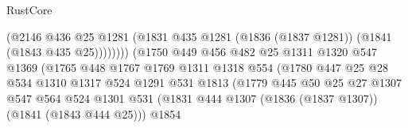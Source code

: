 \begin{lexlean}{RustCore}
\begin{coremodule}
                                            (@2146
                                              @436
                                              @25
                                              @1281
                                              (@1831
                                                @435
                                                @1281
                                                (@1836 (@1837 @1281))
                                                (@1841 (@1843 @435 @25))))))))
                                    (@1750
                                      @449
                                      @456
                                      @482
                                      @25
                                      @1311
                                      @1320
                                      @547
                                      @1369
                                      (@1765
                                        @448
                                        @1767
                                        @1769
                                        @1311
                                        @1318
                                        @554
                                        (@1780
                                          @447
                                          @25
                                          @28
                                          @534
                                          @1310
                                          @1317
                                          @524
                                          @1291
                                          @531
                                          @1813
                                          (@1779
                                            @445
                                            @50
                                            @25
                                            @27
                                            @1307
                                            @547
                                            @564
                                            @524
                                            @1301
                                            @531
                                            (@1831
                                              @444
                                              @1307
                                              (@1836 (@1837 @1307))
                                              (@1841 (@1843 @444 @25)))
                                            @1854

\end{coremodule}
\end{lexlean}
